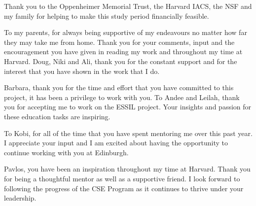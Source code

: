 \documentclass[11pt]{gsasthesis} %
\begin{document}
\renewcommand{\contentsname}{\protect\centering\protect\Large Contents}
\renewcommand{\listtablename}{\protect\centering\protect\Large List of Tables}
\renewcommand{\listfigurename}{\protect\centering\protect\Large List of Figures}

\newcommand{\indep}{\mathrel{\text{\scalebox{1.07}{$\perp\mkern-10mu\perp$}}}}

\tableofcontents %

\listoffigures
\begin{acknowledgments}
	Thank you to the Oppenheimer Memorial Trust, the Harvard IACS, the NSF and my family for helping to make this study period financially feasible.

  To my parents, for always being supportive of my endeavours no matter how far they may take me from home. Thank you for your comments, input and the encouragement you have given in reading my work and throughout my time at Harvard. Doug, Niki and Ali, thank you for the constant support and for the interest that you have shown in the work that I do.
  
  Barbara, thank you for the time and effort that you have committed to this project, it has been a privilege to work with you. To Andee and Leilah, thank you for accepting me to work on the ESSIL project. Your insights and passion for these education tasks are inspiring.
   
  To Kobi, for all of the time that you have spent mentoring me over this past year. I appreciate your input and I am excited about having the opportunity to continue working with you at Edinburgh.
   
   Pavlos, you have been an inspiration throughout my time at Harvard. Thank you for being a thoughtful mentor as well as a supportive friend. I look forward to following the progress of the CSE Program as it continues to thrive under your leadership.
\end{acknowledgments}


\end{document}
